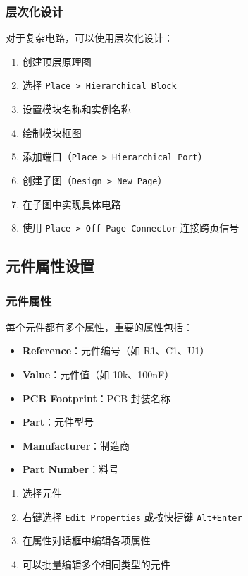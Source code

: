 \subsubsection{层次化设计}

对于复杂电路，可以使用层次化设计：


\begin{enumerate}
  \item 创建顶层原理图
  \item 选择 \lstinline{Place > Hierarchical Block}
  \item 设置模块名称和实例名称
  \item 绘制模块框图
  \item 添加端口（\lstinline{Place > Hierarchical Port}）
  \item 创建子图（\lstinline{Design > New Page}）
  \item 在子图中实现具体电路
  \item 使用 \lstinline{Place > Off-Page Connector} 连接跨页信号
\end{enumerate}

\subsection{元件属性设置}

\subsubsection{元件属性}

每个元件都有多个属性，重要的属性包括：

\begin{itemize}
  \item \textbf{Reference}：元件编号（如 R1、C1、U1）
  \item \textbf{Value}：元件值（如 10k、100nF）
  \item \textbf{PCB Footprint}：PCB 封装名称
  \item \textbf{Part}：元件型号
  \item \textbf{Manufacturer}：制造商
  \item \textbf{Part Number}：料号
\end{itemize}


\begin{enumerate}
  \item 选择元件
  \item 右键选择 \lstinline{Edit Properties} 或按快捷键 \lstinline{Alt+Enter}
  \item 在属性对话框中编辑各项属性
  \item 可以批量编辑多个相同类型的元件
\end{enumerate}

